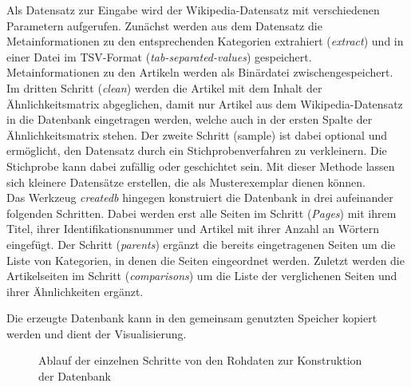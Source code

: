 Als Datensatz zur Eingabe wird der Wikipedia-Datensatz mit verschiedenen Parametern aufgerufen.
Zunächst werden aus dem Datensatz die Metainformationen zu den entsprechenden Kategorien extrahiert (\emph{extract}) und in einer Datei im TSV-Format (\emph{tab-separated-values}) gespeichert.
Metainformationen zu den Artikeln werden als Binärdatei zwischengespeichert. %
Im dritten Schritt (\emph{clean}) werden die Artikel mit dem Inhalt der Ähnlichkeitsmatrix abgeglichen, damit nur Artikel aus dem Wikipedia-Datensatz in die Datenbank eingetragen werden, welche auch in der ersten Spalte der Ähnlichkeitsmatrix stehen.
Der zweite Schritt (sample) ist dabei optional und ermöglicht, den Datensatz durch ein Stichprobenverfahren zu verkleinern.
Die Stichprobe kann dabei zufällig oder geschichtet sein. 
Mit dieser Methode lassen sich kleinere Datensätze erstellen, die als Musterexemplar dienen können.\\
Das Werkzeug \emph{createdb} hingegen konstruiert die Datenbank in drei aufeinander folgenden Schritten.
Dabei werden erst alle Seiten im Schritt (\emph{Pages}) mit ihrem Titel, ihrer Identifikationsnummer und Artikel mit ihrer Anzahl an Wörtern eingefügt.
Der Schritt (\emph{parents}) ergänzt die bereits eingetragenen Seiten um die Liste von Kategorien, in denen die Seiten eingeordnet werden.
Zuletzt werden die Artikelseiten im Schritt (\emph{comparisons}) um die Liste der verglichenen Seiten und ihrer Ähnlichkeiten ergänzt.

Die erzeugte Datenbank kann in den gemeinsam genutzten Speicher kopiert werden und dient der Visualisierung.


\begin{figure}
    \centering
    \caption{Ablauf der einzelnen Schritte von den Rohdaten zur Konstruktion der Datenbank}
    \label{fig:ablauf-daten}
\end{figure}


